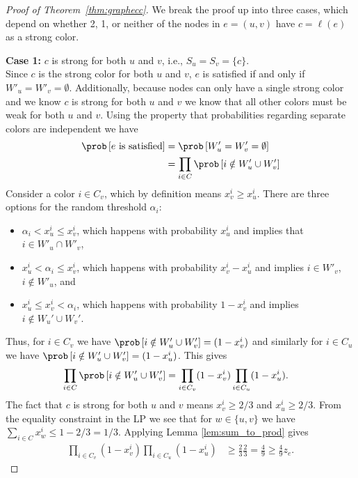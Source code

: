 \begin{proof}[Proof of Theorem~\ref{thm:graphecc}]
	
	We break the proof up into three cases, which depend on whether 2, 1, or neither of the nodes in $e = (u,v)$ have $c = \ell(e)$ as a strong color.
	
	\textbf{Case 1:} $c$ is strong for both $u$ and $v$, i.e., $S_u = S_v = \{c\}$.\\
	Since $c$ is the strong color for both $u$ and $v$, $e$ is satisfied if and only if $W'_u = W'_v = \emptyset$. Additionally, because nodes can only have a single strong color and we know $c$ is strong for both $u$ and $v$ we know that all other colors must be weak for both $u$ and $v$. Using the property that probabilities regarding separate colors are independent we have
	\begin{align*}
		\prob\left[e \text{ is satisfied}\right] & = \prob\left[W'_u = W'_v = \emptyset\right] \\
		& = \prod_{i \in C}\prob\left[ i \notin W'_u \cup W'_v \right]
	\end{align*}
	Consider a color $i \in C_v$, which by definition means $x_v^i \geq x_u^i$. There are three options for the random threshold $\alpha_i$:
	\begin{itemize}
		\item $\alpha_i < x_u^i \leq x_v^i$, which happens with probability $x_u^i$ and implies that $i \in W'_u \cap W'_v$,
		\item $x_u^i < \alpha_i \leq x_v^i$, which happens with probability $x_v^i - x_u^i$ and implies $i \in W'_v$, $i \notin W'_u$, and
		\item $x_u^i \leq x_v^i < \alpha_i$, which happens with probability $1 - x_v^i$ and implies $i \notin W_u' \cup W_v'$.
	\end{itemize}
	Thus, for $i \in C_v$ we have $\prob\left[i \notin W'_u \cup W'_v\right] = (1 - x_v^i)$ and similarly for $i \in C_u$ we have $\prob\left[i \notin W'_u \cup W'_v\right] = (1 - x_u^i)$. This gives
	\begin{align*}
		\prod_{i \in C}\prob\left[ i \notin W'_u \cup W'_v \right] & = \prod_{i \in C_v}(1 - x_v^i)\prod_{i \in C_u}(1 - x_u^i).
	\end{align*}
	The fact that $c$ is strong for both $u$ and $v$ means $x_v^i \geq 2/3$ and $x_u^i \geq 2/3$. From the equality constraint in the LP we see that for $w\in\{u,v\}$ we have $\sum_{i \in C}x_w^i \leq 1 - 2/3 = 1/3$. Applying Lemma \ref{lem:sum_to_prod} gives
	\begin{align*}
		\prod_{i \in C_v}(1 - x_v^i)\prod_{i \in C_u}(1 - x_u^i) & \geq \frac{2}{3}\frac{2}{3} = \frac{4}{9} \geq \frac{4}{9}z_e.
	\end{align*}


\end{proof}
